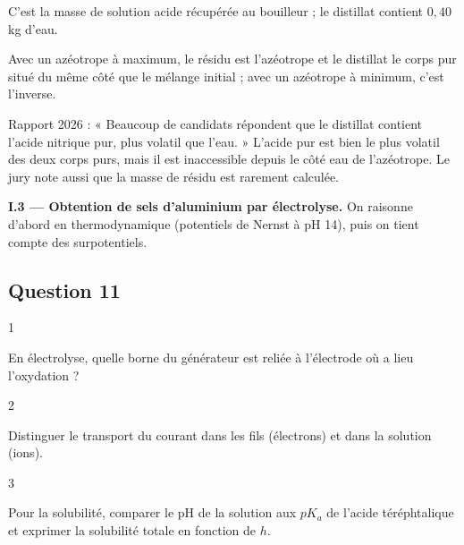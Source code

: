 \documentclass[11pt,a4paper]{article}
\begin{document}
C'est la masse de solution acide récupérée au bouilleur ; le distillat contient \(0{,}40\) kg d'eau.

\begin{methode}

Avec un azéotrope à maximum, le résidu est l'azéotrope et le distillat le corps pur situé du même côté que le mélange initial ; avec un azéotrope à minimum, c'est l'inverse.

\end{methode}

\begin{piege}

Rapport 2026 : « Beaucoup de candidats répondent que le distillat contient l'acide nitrique pur, plus volatil que l'eau. » L'acide pur est bien le plus volatil des deux corps purs, mais il est inaccessible depuis le côté eau de l'azéotrope. Le jury note aussi que la masse de résidu est rarement calculée.

\end{piege}

\textbf{I.3 --- Obtention de sels d'aluminium par électrolyse.} On raisonne d'abord en thermodynamique (potentiels de Nernst à pH 14), puis on tient compte des surpotentiels.

\hypertarget{question-11}{%
\subsection{Question 11}\label{question-11}}

\begin{indication}{1}

En électrolyse, quelle borne du générateur est reliée à l'électrode où a lieu l'oxydation ?

\end{indication}

\begin{indication}{2}

Distinguer le transport du courant dans les fils (électrons) et dans la solution (ions).

\end{indication}

\begin{indication}{3}

Pour la solubilité, comparer le pH de la solution aux \(pK_a\) de l'acide téréphtalique et exprimer la solubilité totale en fonction de \(h\).

\end{indication}
\end{document}
